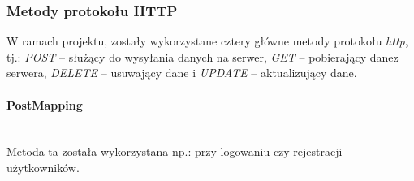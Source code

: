 \documentclass[twoside]{projektInzynierskiMS}
\numberwithin{figure}{section}
\begin{document}
\subsubsection{Metody protokołu HTTP}
W ramach projektu, zostały wykorzystane cztery główne metody protokołu \textit{http}, tj.: \textit{POST} – służący do wysyłania danych na serwer, \textit{GET} – pobierający dane\linebreak z serwera, \textit{DELETE} – usuwający dane i \textit{UPDATE} – aktualizujący dane.

\paragraph{PostMapping}
\mbox{} \\ \indent
Metoda ta została wykorzystana np.: przy logowaniu czy rejestracji użytkowników.
\end{document}
